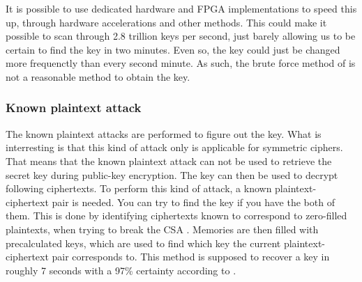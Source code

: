 It is possible to use dedicated hardware and FPGA implementations to 
speed this up, through hardware accelerations and other methods. This 
could make it possible to scan through 2.8 trillion keys per second, 
just barely allowing us to be certain to find the key in two minutes. 
Even so, the key could just be changed more frequenctly than every 
second minute. As such, the brute force method of is not a reasonable 
method to obtain the key.

\subsubsection{Known plaintext attack}\label{sec:kpa}
The known plaintext attacks are performed to figure out the key. What 
is interresting is that this kind of attack only is applicable for 
symmetric ciphers. That means that the known plaintext attack can not 
be used to retrieve the secret key during public-key encryption. The 
key can then be used to decrypt following ciphertexts. To perform this 
kind of attack, a known plaintext-ciphertext pair is needed. You can 
try to find the key if you have the both of them. This is done by 
identifying ciphertexts known to correspond to zero-filled plaintexts, 
when trying to break the CSA \citep{Breaking:2012}. Memories are then 
filled with precalculated keys, which are used to find which key the 
current plaintext-ciphertext pair corresponds to. This method is 
supposed to recover a key in roughly 7 seconds with a 97\% certainty 
according to \citet{Breaking:2012}.
